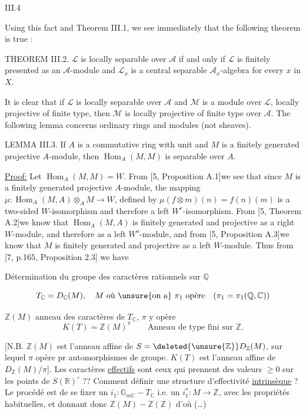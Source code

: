 


III.4

Using this fact and Theorem III.1, we see immediately that the
following theorem is true :

THEOREM III.2. $\mathcal L$ is locally separable over $\mathcal A$ if and only if $\mathcal L$
is finitely presented as an $\mathcal A$-module and $\mathcal L_x$ is a central separable
$\mathcal A_x$-algebra for every $x$ in $X$.

It is clear that if $\mathcal L$ is locally separable over $\mathcal A$ and $\mathcal M$ is a
module over $\mathcal L$, locally projective of finite type, then $\mathcal M$ is locally
projective of finite type over $\mathcal A$. The following lemma concerns
ordinary rings and modules (not sheaves).

LEMMA III.3. If $A$ is a commutative ring with unit and $M$ is a
finitely generated projective $A$-module, then $\operatorname{Hom}_A(M,M)$ is separable
over $A$.

\uline{Proof:} Let $\operatorname{Hom}_A(M,M)=W$. From [5, Proposition A.1]we
see that since $M$ is a finitely generated projective $A$-module, the
mapping $\mu:\operatorname{Hom}_A(M,A)\otimes_A M\to W$, defined by
$\mu(f\otimes m)(n)=f(n)(m)$ is a two-sided $W$-isomorphism and
therefore a left $W^e$-isomorphism. From [5, Theorem A.2]we
know that $\operatorname{Hom}_A(M,A)$ is finitely generated and projective as a right
$W$-module, and therefore as a left $W^o$-module, and from [5,
Proposition A.3]we know that $M$ is finitely generated and projective
as a left $W$-module. Thus from [7, p.165, Proposition 2.3] we have


Détermination du groupe des caractères rationnels sur $\mathbb Q$

\[
T_{\mathbb C}=D_{\mathbb C}(M),\quad M\text{ où \unsure{on a} }\pi_1\text{ opère}\quad(\pi_1=\pi_1(\mathbb Q,\mathbb C))
\]

$\mathbb Z(M)$ anneau des caractères  de $T_{\mathbb C}$, $\pi$ y opère
\[
K(T)=\mathbb Z(M)^\pi\qquad\text{Anneau de type fini sur }\mathbb Z.
\]

[N.B. $\mathbb Z(M)$ est l'anneau affine de $S=\deleted{\unsure{\mathbb Z}}D_{\mathbb Z}(M)$, sur lequel $\pi$ opère pr automorphismes de groupe. $K(T)$ est l'anneau affine de $D_{\mathbb Z}(M)/\pi$]. Les caractères \uline{effectifs} sont ceux qui prennent des valeurs $\geq0$ sur les points de $S(\mathbb R)^\circ$ ?? Comment définir une structure d'effectivité \uline{intrinsèque} ? Le procédé  est de se fixer un $i_1:\mathbb G_{m\mathbb C}\mathbin{-}T_{\mathbb C}$ i.e. un $i_1^*:M\longrightarrow\mathbb Z$, avec les propriétés habituelles, et donnant donc $\mathbb Z(M)\mathbin{-}\mathbb Z(\mathbb Z)$ d'où
(\ldots)

